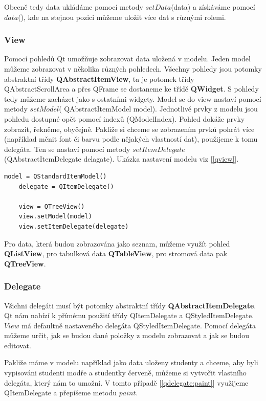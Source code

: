 Obecně tedy data ukládáme pomocí metody $setData$(data) a získáváme pomocí $data$(), kde na stejnou pozici můžeme uložit více dat s různými rolemi.
 
\subsubsection*{View}

Pomocí pohledů Qt umožňuje zobrazovat data uložená v modelu. Jeden model můžeme zobrazovat v několika různých pohledech. Všechny pohledy jsou potomky abstraktní třídy \textbf{QAbstractItemView}, ta je potomek třídy QAbstractScrollArea a přes QFrame se dostaneme ke třídě \textbf{QWidget}. S pohledy tedy můžeme zacházet jako s ostatními widgety. Model se do view nastaví pomocí metody $setModel$( QAbstractItemModel model). Jednotlivé prvky z modelu jsou pohledu dostupné opět pomocí indexů (QModelIndex). Pohled dokáže prvky zobrazit, řekněme, obyčejně. Pakliže si chceme se zobrazením prvků pohrát více (například měnit font či barvu podle nějakých vlastností dat), použijeme k tomu delegáta. Ten se nastaví pomocí metody $setItemDelegate$(QAbstractItemDelegate delagate). Ukázka nastavení modelu viz [\autoref{qview}]. \\

\begin{lstlisting}[label=qview,caption={View - vytvoření pohledu a nastavení modelu a delegáta}, morekeywords={QItemDelegate, QStandardItemModel, QTreeView}]
	model = QStandardItemModel()
	delegate = QItemDelegate()

	view = QTreeView()
	view.setModel(model)
	view.setItemDelegate(delegate)
\end{lstlisting}

Pro data, která budou zobrazována jako seznam, můžeme využít pohled \textbf{QListView}, pro tabulková data \textbf{QTableView}, pro stromová data pak \textbf{QTreeView}.

\subsubsection*{Delegate}
Všichni delegáti musí být potomky abstraktní třídy \textbf{QAbstractItemDelegate}. Qt nám nabízí k přímému použití třídy QItemDelegate a QStyledItemDelegate. $View$ má defaultně nastaveného delegáta QStyledItemDelegate. Pomocí delegáta můžeme určit, jak se budou dané položky z modelu zobrazovat a jak se budou editovat. 

Pakliže máme v modelu například jako data uloženy studenty a chceme, aby byli vypisováni studenti modře a studentky červeně, můžeme si vytvořit vlastního delegáta, který nám to umožní. V tomto případě [\lstlistingname \ref{qdelegate:paint}] využijeme QItemDelegate a přepíšeme metodu $paint$. \\

